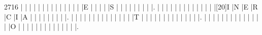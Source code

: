 \begin{Puzzle}{27}{16}
|{}    |{}    |{}    |{}    |{}    |{}    |{}    |{}    |{}    |{}    |{}    |{}    |{}    |{}    |E     |{}    |{}    |{}    |{}    |S     |{}    |{}    |{}    |{}    |{}    |{}    |{}   |{} |.
|{}    |{}    |{}    |{}    |{}    |{}    |{}    |{}    |{}    |{}    |{}    |{}    |{}    |[20]I |N     |E     |R     |C     |I     |A     |{}    |{}    |{}    |{}    |{}    |{}    |{}   |{} |.
|{}    |{}    |{}    |{}    |{}    |{}    |{}    |{}    |{}    |{}    |{}    |{}    |{}    |{}    |T     |{}    |{}    |{}    |{}    |{}    |{}    |{}    |{}    |{}    |{}    |{}    |{}   |{} |.
|{}    |{}    |{}    |{}    |{}    |{}    |{}    |{}    |{}    |{}    |{}    |{}    |{}    |{}    |O     |{}    |{}    |{}    |{}    |{}    |{}    |{}    |{}    |{}    |{}    |{}    |{}   |{} |.
\end{Puzzle}

